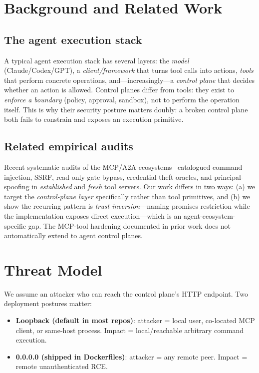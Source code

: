 \documentclass{llncs}
\begin{document}
\section{Background and Related Work}\label{sec:background}

\subsection{The agent execution stack}\label{sub:stack}
A typical agent execution stack has several layers: the \emph{model} (Claude/Codex/GPT), a \emph{client/framework} that turns tool calls into actions, \emph{tools} that perform concrete operations, and---increasingly---a \emph{control plane} that decides whether an action is allowed. Control planes differ from tools: they exist to \emph{enforce a boundary} (policy, approval, sandbox), not to perform the operation itself. This is why their security posture matters doubly: a broken control plane both fails to constrain and exposes an execution primitive.

\subsection{Related empirical audits}\label{sub:related}
Recent systematic audits of the MCP/A2A ecosystems~\cite{chen2026mcp,pcfg2026,anon2026mcp} catalogued command injection, SSRF, read-only-gate bypass, credential-theft oracles, and principal-spoofing in \emph{established} and \emph{fresh} tool servers. Our work differs in two ways: (a) we target the \emph{control-plane layer} specifically rather than tool primitives, and (b) we show the recurring pattern is \emph{trust inversion}---naming promises restriction while the implementation exposes direct execution---which is an agent-ecosystem-specific gap. The MCP-tool hardening documented in prior work does not automatically extend to agent control planes.

\section{Threat Model}\label{sec:threat}

We assume an attacker who can reach the control plane's HTTP endpoint. Two deployment postures matter:

\begin{itemize}
    \item \textbf{Loopback (default in most repos)}: attacker = local user, co-located MCP client, or same-host process. Impact = local/reachable arbitrary command execution.
    \item \textbf{0.0.0.0 (shipped in Dockerfiles)}: attacker = any remote peer. Impact = remote unauthenticated RCE.
\end{itemize}
\end{document}
